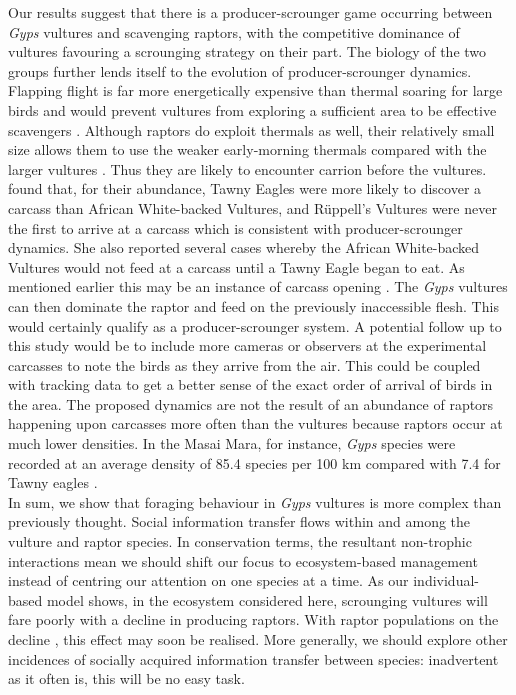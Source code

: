 Our results suggest that there is a producer-scrounger game occurring between \textit{Gyps} vultures and scavenging raptors, with the competitive dominance of vultures favouring a scrounging strategy on their part. 
The biology of the two groups further lends itself to the evolution of producer-scrounger dynamics. Flapping flight is far more energetically expensive than thermal soaring for large birds \citep{hedenstrom1993migration} and would prevent vultures from exploring a sufficient area to be effective scavengers \citep{ruxton2004obligate}. Although raptors do exploit thermals as well, their relatively small size allows them to use the weaker early-morning thermals compared with the larger vultures \citep{cone1962thermal}. Thus they are likely to encounter carrion before the vultures. \cite{kendall2013alternative} found that, for their abundance, Tawny Eagles were more likely to discover a carcass than African White-backed Vultures, and R{\"u}ppell's Vultures were never the first to arrive at a carcass which is consistent with producer-scrounger dynamics. She also reported several cases whereby the African White-backed Vultures would not feed at a carcass until a Tawny Eagle began to eat. As mentioned earlier this may be an instance of carcass opening \citep{kendall2013alternative}. The \textit{Gyps} vultures can then dominate the raptor and feed on the previously inaccessible flesh. This would certainly qualify as a producer-scrounger system. A potential follow up to this study would be to include more cameras or observers at the experimental carcasses to note the birds as they arrive from the air. This could be coupled with tracking data to get a better sense of the exact order of arrival of birds in the area.
The proposed dynamics are not the result of an abundance of raptors happening upon carcasses more often than the vultures because raptors occur at much lower densities. In the Masai Mara, for instance, \textit{Gyps} species were recorded at an average density of 85.4 species per 100 km compared with 7.4 for Tawny eagles \citep{virani2011major}.\\
\indent
In sum, we show that foraging behaviour in \textit{Gyps} vultures is more complex than previously thought. Social information transfer flows within and among the vulture and raptor species. In conservation terms, the resultant non-trophic interactions \citep{kefi2012more} mean we should shift our focus to ecosystem-based management \citep{slocombe1993implementing} instead of centring our attention on one species at a time. As our individual-based model shows, in the ecosystem considered here, scrounging vultures will fare poorly with a decline in producing raptors. With raptor populations on the decline \citep{ogada2010decline}, this effect may soon be realised. More generally, we should explore other incidences of socially acquired information transfer between species: inadvertent as it often is, this will be no easy task. 



